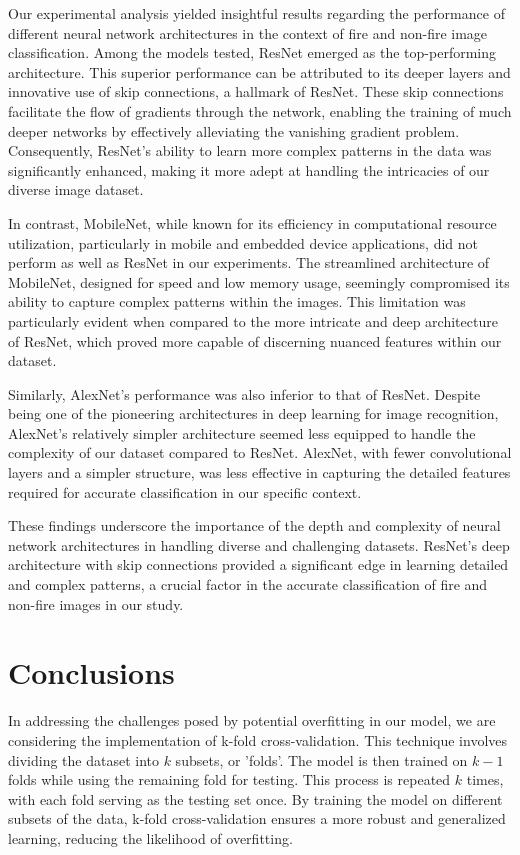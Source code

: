 Our experimental analysis yielded insightful results regarding the performance of different neural network architectures in the context of fire and non-fire image classification. Among the models tested, ResNet emerged as the top-performing architecture. This superior performance can be attributed to its deeper layers and innovative use of skip connections, a hallmark of ResNet. These skip connections facilitate the flow of gradients through the network, enabling the training of much deeper networks by effectively alleviating the vanishing gradient problem. Consequently, ResNet's ability to learn more complex patterns in the data was significantly enhanced, making it more adept at handling the intricacies of our diverse image dataset.

In contrast, MobileNet, while known for its efficiency in computational resource utilization, particularly in mobile and embedded device applications, did not perform as well as ResNet in our experiments. The streamlined architecture of MobileNet, designed for speed and low memory usage, seemingly compromised its ability to capture complex patterns within the images. This limitation was particularly evident when compared to the more intricate and deep architecture of ResNet, which proved more capable of discerning nuanced features within our dataset.

Similarly, AlexNet's performance was also inferior to that of ResNet. Despite being one of the pioneering architectures in deep learning for image recognition, AlexNet's relatively simpler architecture seemed less equipped to handle the complexity of our dataset compared to ResNet. AlexNet, with fewer convolutional layers and a simpler structure, was less effective in capturing the detailed features required for accurate classification in our specific context.

These findings underscore the importance of the depth and complexity of neural network architectures in handling diverse and challenging datasets. ResNet's deep architecture with skip connections provided a significant edge in learning detailed and complex patterns, a crucial factor in the accurate classification of fire and non-fire images in our study.


\section{Conclusions}


In addressing the challenges posed by potential overfitting in our model, we are considering the implementation of k-fold cross-validation. This technique involves dividing the dataset into \(k\) subsets, or 'folds'. The model is then trained on \(k-1\) folds while using the remaining fold for testing. This process is repeated \(k\) times, with each fold serving as the testing set once. By training the model on different subsets of the data, k-fold cross-validation ensures a more robust and generalized learning, reducing the likelihood of overfitting.


